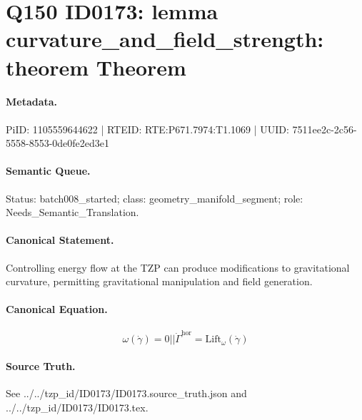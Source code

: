 \section*{Q150 ID0173: lemma curvature\_and\_field\_strength: theorem Theorem}
\paragraph{Metadata.}
PiID: 1105559644622 | RTEID: RTE:P671.7974:T1.1069 | UUID: 7511ee2c-2c56-5558-8553-0de0fe2ed3e1

\paragraph{Semantic Queue.}
Status: batch008\_started; class: geometry\_manifold\_segment; role: Needs\_Semantic\_Translation.

\paragraph{Canonical Statement.}
Controlling energy flow at the TZP can produce modifications to gravitational curvature, permitting gravitational manipulation and field generation.

\paragraph{Canonical Equation.}
\[
\omega(\dot\gamma)=0 || \dot\Gamma^{\mathrm{hor}} = \mathrm{Lift}_{\omega}(\dot\gamma)
\]

\paragraph{Source Truth.}
See ../../tzp\_id/ID0173/ID0173.source\_truth.json and ../../tzp\_id/ID0173/ID0173.tex.
